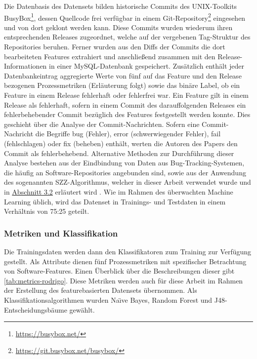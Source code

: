 Die Datenbasis des Datensets bilden historische Commits des UNIX-Toolkits BusyBox\footnote{\url{https://busybox.net/}}, dessen Quellcode frei verfügbar in einem Git-Repository\footnote{\url{https://git.busybox.net/busybox/}} eingesehen und von dort geklont werden kann. Diese Commits wurden wiederum ihren entsprechenden Releases zugeordnet, welche auf der vergebenen Tag-Struktur des Repositories beruhen. Ferner wurden aus den Diffs der Commits die dort bearbeiteten Features extrahiert und anschließend zusammen mit den Release-Informationen in einer MySQL-Datenbank gespeichert. Zusätzlich enthält jeder Datenbankeintrag aggregierte Werte von fünf auf das Feature und den Release bezogenen Prozessmetriken (Erläuterung folgt) sowie das binäre Label, ob ein Feature in einem Release fehlerhaft oder fehlerfrei war. Ein Feature gilt in einem Release als fehlerhaft, sofern in einem Commit des darauffolgenden Releases ein fehlerbehebender Commit bezüglich des Features festgestellt werden konnte. Dies geschieht über die Analyse der Commit-Nachrichten. Sofern eine Commit-Nachricht die Begriffe \glqq bug\grqq{} (Fehler), \glqq error\grqq{} (schwerwiegender Fehler), \glqq fail\grqq{} (fehlschlagen) oder \glqq fix\grqq{} (beheben) enthält, werten die Autoren des Papers den Commit als fehlerbehebend. Alternative Methoden zur Durchführung dieser Analyse bestehen aus der Eindbindung von Daten aus Bug-Tracking-Systemen, die häufig an Software-Repositories angebunden sind, sowie aus der Anwendung des sogenannten SZZ-Algorithmus, welcher in dieser Arbeit verwendet wurde und in \hyperref[szz-def]{Abschnitt 3.2} erläutert wird \cite{Sliwerski2005,Zimmermann2007}. Wie im Rahmen des überwachten Machine Learning üblich, wird das Datenset in Trainings- und Testdaten in einem Verhältnis von 75:25 geteilt. 

\subsubsection*{Metriken und Klassifikation}

Die Trainingsdaten werden dann den Klassifikatoren zum Training zur Verfügung gestellt. Als Attribute dienen fünf Prozessmetriken mit spezifischer Betrachtung von Software-Features. Einen Überblick über die Beschreibungen dieser gibt \autoref{tab:metrics-rodrigo}. Diese Metriken werden auch für diese Arbeit im Rahmen der Erstellung des featurebasierten Datensets übernommen. Als Klassifikationsalgorithmen wurden Na\"{\i}ve Bayes, Random Forest und J48-Entscheidungsbäume gewählt.

